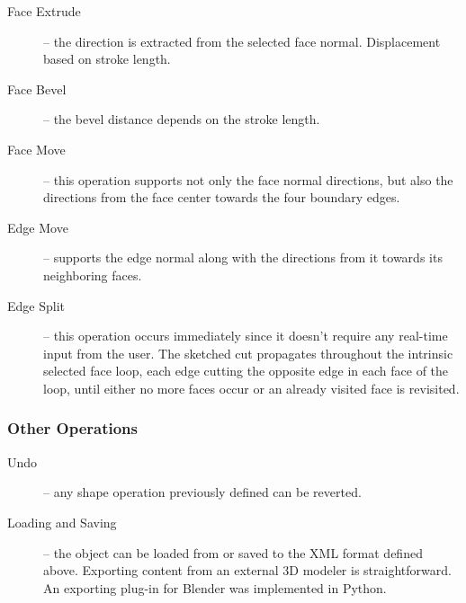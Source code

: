 \begin{description}
	\item[Face Extrude] --
		the direction is extracted from the selected face normal. Displacement based on stroke length.
		
	\item[Face Bevel] --
		the bevel distance depends on the stroke length.
		
	\item[Face Move] --
		this operation supports not only the face normal directions,
		but also the directions from the face center towards the four boundary edges.
		
	\item[Edge Move] --
		supports the edge normal along with the directions from it towards its neighboring faces.
		
	\item[Edge Split] --
		this operation occurs immediately since it doesn't require any real-time input from the user.
		The sketched cut propagates throughout the intrinsic selected face loop, each edge cutting
		the opposite edge in each face of the loop, until either no more faces occur or an already
		visited face is revisited. 
\end{description}

\subsubsection{Other Operations}

\begin{description}
	\item[Undo] --
		any shape operation previously defined can be reverted.
		
	\item[Loading and Saving] --
		the object can be loaded from or saved to the XML format defined above.
		Exporting content from an external 3D modeler is straightforward.
		An exporting plug-in for Blender was implemented in Python.
\end{description}

